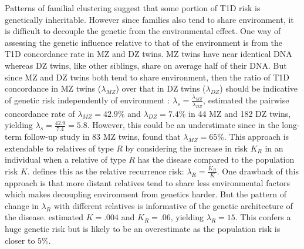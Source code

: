 Patterns of familial clustering suggest that some portion of T1D risk is genetically inheritable.
However since families also tend to share environment, it is difficult to decouple the genetic from the environmental effect.
One way of assessing the genetic influence relative to that of the environment is from the T1D concordance rate in \gls{MZ} and \gls{DZ} twins.
MZ twins have near identical \gls{DNA} whereas DZ twins, like other siblings, share on average half of their DNA.
But since \gls{MZ} and \gls{DZ} twins both tend to share environment, then the ratio of T1D concordance in \gls{MZ} twins ($\lambda_{MZ}$) 
over that in DZ twins ($\lambda_{DZ}$) should be indicative of genetic risk independently of environment \citep{Clayton:2009kf}:
$ \lambda_s = \frac{\lambda_{MZ}}{\lambda_{DZ}}$,
\citet{Hyttinen:2003kn} estimated the pairwise concordance rate of $\lambda_{MZ}=42.9\%$ and $\lambda_{DZ}=7.4\%$ in 44 MZ and 182 DZ twins,
yielding $\lambda_s = \frac{42.9}{7.4} = 5.8$.
However, this could be an understimate since in the long-term follow-up study in 83 MZ twins, \citet{Redondo:2008} found that $\lambda_{MZ}=65\%$.
This approach is extendable to relatives of type $R$ by considering the increase in risk $K_R$ in an individual when a relative of type $R$ has the disease compared to the population risk $K$.
\citet{Risch:1987wm} defines this as the relative recurrence risk: $\lambda_R = \frac{K_R}{K}$.
One drawback of this approach is that more distant relatives tend to share less environmental factors which makes decoupling environment from genetics harder.
But the pattern of change in $\lambda_R$ with different relatives is informative of the genetic architecture of the disease.
\cite{Risch:1987wm} estimated $K=.004$ and $K_R=.06$, yielding $\lambda_R=15$.
This confers a huge genetic risk but is likely to be an overestimate as the population risk is closer to $5\%$.

